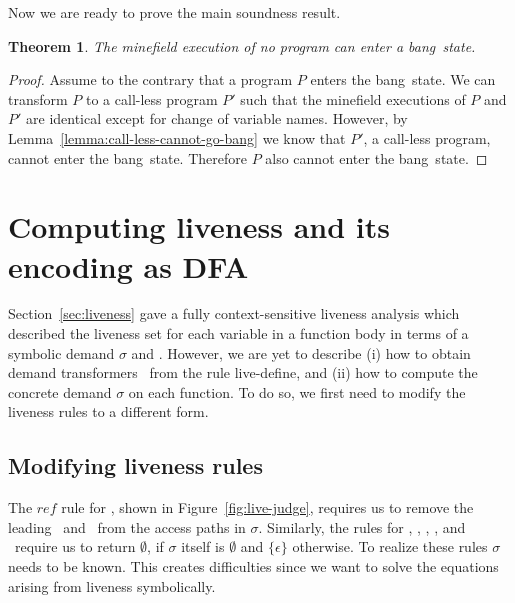 \documentclass[9pt]{sigplanconf}
\newcommand{\bang}{\mbox{\sc bang}}
\newtheorem{theorem}{Theorem}[section]
\begin{document}
Now we are ready to prove the main soundness result.

\begin{theorem}
The  minefield  execution of  no  program  can enter  a
\bang\ state.
\end{theorem}
 
\begin{proof}
Assume to  the contrary that  a program $P$  enters the
\bang\  state.  We can  transform  $P$  to a  call-less
program $P'$ such that  the minefield executions of $P$
and $P'$  are identical  except for change  of variable
names.             However,                 by
Lemma~\ref{lemma:call-less-cannot-go-bang} we know that
$P'$,   a   call-less   program,   cannot   enter   the
\bang\  state.  Therefore   $P$  also  cannot  enter  the
\bang\ state.
\end{proof}
 




\section{Computing liveness and its encoding as DFA}\label{sec:computing}
Section~\ref{sec:liveness}  gave   a  fully context-sensitive
liveness analysis which 
described the  liveness set for  each variable  in a function  body in
terms of  a symbolic demand  $\sigma$ and \Lfonly.  However,  we are yet
to describe  (i) how to obtain demand  transformers \Lfonly\ from
the  rule {\sc  live-define}, and  (ii)  how to  compute the  concrete
demand $\sigma$  on each function.   To do so,  we first need to  modify the
liveness rules to a different form.

\subsection{Modifying liveness rules}

The   $\mathit{ref}$   rule   for   \CONS,   shown   in
Figure~\ref{fig:live-judge}, requires us  to remove the
leading  \acar\ and  \acdr\  from the  access paths  in
$\sigma$.  Similarly, the rules  for \CAR, \CDR, \PRIM,
\NULLQ, and \SIF\ require  us to return $\emptyset$, if
$\sigma$      itself       is      $\emptyset$      and
$\lbrace\epsilon\rbrace$  otherwise.  To  realize these
rules  $\sigma$   needs  to  be  known.   This  creates
difficulties  since  we  want to  solve  the  equations
arising from liveness symbolically.
\end{document}
